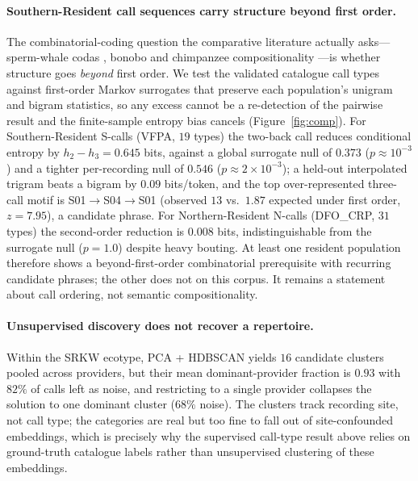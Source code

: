 \documentclass[11pt]{article}
\begin{document}
\paragraph{Southern-Resident call sequences carry structure beyond first order.} The
combinatorial-coding question the comparative literature actually asks---sperm-whale codas
\citep{sharma2024}, bonobo and chimpanzee compositionality
\citep{berthet2025bonobo,crockford2025}---is whether structure goes \emph{beyond} first order.
We test the validated catalogue call types against first-order Markov surrogates that preserve
each population's unigram and bigram statistics, so any excess cannot be a re-detection of the
pairwise result and the finite-sample entropy bias cancels (Figure~\ref{fig:comp}). For
Southern-Resident S-calls (VFPA, $19$ types) the two-back call reduces conditional entropy by
$h_2-h_3=0.645$ bits, against a global surrogate null of $0.373$ ($p\approx10^{-3}$) and a
tighter per-recording null of $0.546$ ($p\approx2\times10^{-3}$); a held-out interpolated
trigram beats a bigram by $0.09$ bits/token, and the top over-represented three-call
motif is S01$\to$S04$\to$S01 (observed $13$ vs.\ $1.87$ expected under first order, $z=7.95$),
a candidate phrase. For Northern-Resident N-calls (DFO\_CRP, $31$ types) the second-order
reduction is $0.008$ bits, indistinguishable from the surrogate null ($p=1.0$) despite heavy
bouting. At least one resident population therefore shows a beyond-first-order
combinatorial prerequisite with recurring candidate phrases; the other does not on this
corpus. It remains a statement about call ordering, not semantic compositionality.

\paragraph{Unsupervised discovery does not recover a repertoire.} Within the SRKW ecotype,
PCA + HDBSCAN yields $16$ candidate clusters pooled across providers, but their mean
dominant-provider fraction is $0.93$ with $82\%$ of calls left as noise, and restricting to a
single provider collapses the solution to one dominant cluster ($68\%$ noise). The clusters
track recording site, not call type; the categories are real but too fine to fall out of
site-confounded embeddings, which is precisely why the supervised call-type result above relies
on ground-truth catalogue labels \citep{ford1989,filatova2015,wellard2020_data} rather than
unsupervised clustering of these embeddings.
\end{document}
